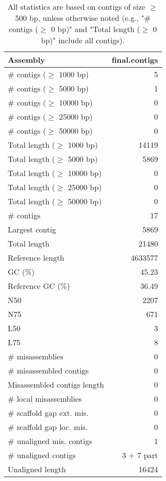 \documentclass[12pt,a4paper]{article}
\begin{document}
\begin{table}[ht]
\begin{center}
\caption{All statistics are based on contigs of size $\geq$ 500 bp, unless otherwise noted (e.g., "\# contigs ($\geq$ 0 bp)" and "Total length ($\geq$ 0 bp)" include all contigs).}
\begin{tabular}{|l*{1}{|r}|}
\hline
Assembly & final.contigs \\ \hline
\# contigs ($\geq$ 1000 bp) & 5 \\ \hline
\# contigs ($\geq$ 5000 bp) & 1 \\ \hline
\# contigs ($\geq$ 10000 bp) & 0 \\ \hline
\# contigs ($\geq$ 25000 bp) & 0 \\ \hline
\# contigs ($\geq$ 50000 bp) & 0 \\ \hline
Total length ($\geq$ 1000 bp) & 14119 \\ \hline
Total length ($\geq$ 5000 bp) & 5869 \\ \hline
Total length ($\geq$ 10000 bp) & 0 \\ \hline
Total length ($\geq$ 25000 bp) & 0 \\ \hline
Total length ($\geq$ 50000 bp) & 0 \\ \hline
\# contigs & 17 \\ \hline
Largest contig & 5869 \\ \hline
Total length & 21480 \\ \hline
Reference length & 4633577 \\ \hline
GC (\%) & 45.23 \\ \hline
Reference GC (\%) & 36.49 \\ \hline
N50 & 2207 \\ \hline
N75 & 671 \\ \hline
L50 & 3 \\ \hline
L75 & 8 \\ \hline
\# misassemblies & 0 \\ \hline
\# misassembled contigs & 0 \\ \hline
Misassembled contigs length & 0 \\ \hline
\# local misassemblies & 0 \\ \hline
\# scaffold gap ext. mis. & 0 \\ \hline
\# scaffold gap loc. mis. & 0 \\ \hline
\# unaligned mis. contigs & 1 \\ \hline
\# unaligned contigs & 3 + 7 part \\ \hline
Unaligned length & 16424 \\ \hline

\end{tabular}
\end{center}
\end{table}
\end{document}
